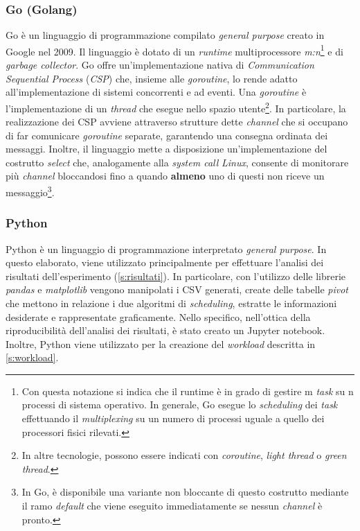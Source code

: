 \subsubsection{Go (Golang)}
Go è un linguaggio di programmazione compilato \textit{general purpose} creato in Google nel 2009. Il linguaggio è dotato di un \textit{runtime} multiprocessore \textit{m:n}\footnote{Con questa notazione si indica che il runtime è in grado di gestire m \textit{task} su n processi di sistema operativo. In generale, Go esegue lo \textit{scheduling} dei \textit{task} effettuando il \textit{multiplexing} su un numero di processi uguale a quello dei processori fisici rilevati.} e di \textit{garbage collector}. Go offre un'implementazione nativa di \textit{Communication Sequential Process} (\textit{CSP}) che, insieme alle \textit{goroutine}, lo rende adatto all'implementazione di sistemi concorrenti e ad eventi. Una \textit{goroutine} è l'implementazione di un \textit{thread} che esegue nello spazio utente\footnote{In altre tecnologie, possono essere indicati con \textit{coroutine}, \textit{light thread} o \textit{green thread}.}. In particolare, la realizzazione dei CSP avviene attraverso strutture dette \textit{channel} che si occupano di far comunicare \textit{goroutine} separate, garantendo una consegna ordinata dei messaggi.
Inoltre, il linguaggio mette a disposizione un'implementazione del costrutto \textit{select} che, analogamente alla \textit{system call} \textit{Linux}, consente di monitorare più \textit{channel} bloccandosi fino a quando \textbf{almeno} uno di questi non riceve un messaggio\footnote{In Go, è disponibile una variante non bloccante di questo costrutto mediante il ramo \textit{default} che viene eseguito immediatamente se nessun \textit{channel} è pronto.}.

\subsubsection{Python}
Python è un linguaggio di programmazione interpretato \textit{general purpose}. In questo elaborato, viene utilizzato principalmente per effettuare l'analisi dei risultati dell'esperimento (\cref{s:risultati}). In particolare, con l'utilizzo delle librerie \textit{pandas}\cite{reback2020pandas} e \textit{matplotlib}\cite{Hunter:2007} vengono manipolati i CSV generati, create delle tabelle \textit{pivot} che mettono in relazione i due algoritmi di \textit{scheduling}, estratte le informazioni desiderate e rappresentate graficamente. Nello specifico, nell'ottica della riproducibilità dell'analisi dei risultati, è stato creato un Jupyter notebook\cite{Giuseppe_tesi_2022}.\\
Inoltre, Python viene utilizzato per la creazione del \textit{workload} descritta in \cref{s:workload}.

